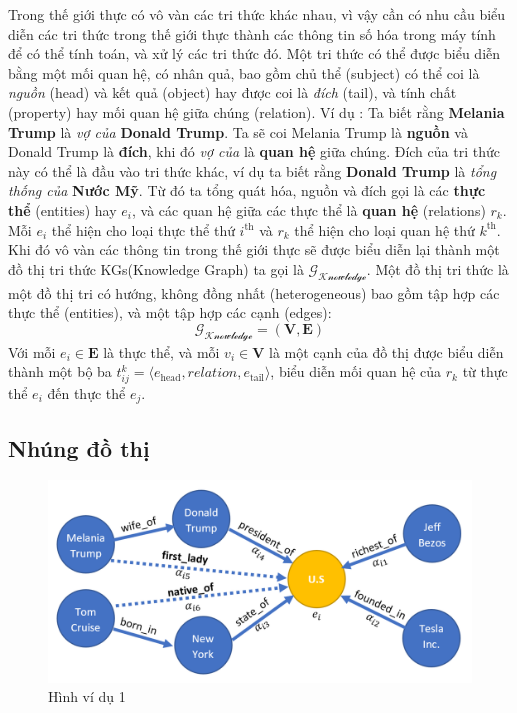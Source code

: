Trong thế giới thực có vô vàn các tri thức khác nhau, vì vậy cần có nhu cầu biểu diễn các tri thức trong thế giới thực thành các thông tin số hóa trong máy tính để có thể tính toán, và xử lý các tri thức đó. Một tri thức có thể được biểu diễn bằng một mối quan hệ, có nhân quả, bao gồm chủ thể (subject) có thể coi là \textit{nguồn} (head) và kết quả (object) hay được coi là \textit{đích} (tail), và tính chất (property) hay mối quan hệ giữa chúng (relation). Ví dụ : Ta biết rằng \textbf{Melania Trump} là \textit{vợ của} \textbf{Donald Trump}. Ta sẽ coi Melania Trump là \textbf{nguồn} và Donald Trump là \textbf{đích}, khi đó \textit{vợ của} là \textbf{quan hệ} giữa chúng. Đích của tri thức này có thể là đầu vào tri thức khác, ví dụ ta biết rằng \textbf{Donald Trump} là \textit{tổng thống của} \textbf{Nước Mỹ}. Từ đó ta tổng quát hóa, nguồn và đích  gọi là các \textbf{thực thể} (entities) hay $e_i$, và các quan hệ giữa các thực thể là \textbf{quan hệ} (relations) $r_k$. Mỗi $e_i$ thể hiện cho loại thực thể thứ $i^\text{th}$ và $r_k$ thể hiện cho loại quan hệ thứ $k^\text{th}$. Khi đó vô vàn các thông tin trong thế giới thực sẽ được biểu diễn lại thành một đồ thị tri thức KGs(Knowledge Graph) ta gọi là $\mathcal{G_{\text{Knowledge}}}$. Một đồ thị tri thức là một đồ thị tri có hướng, không đồng nhất (heterogeneous) bao gồm tập hợp các thực thể (entities), và một tập hợp các cạnh (edges):
$$
\mathcal{G_{\text{Knowledge}}} = (\mathbf{V},\mathbf{E})
$$
Với mỗi $e_i \in \mathbf{E}$ là thực thể, và mỗi $v_i \in \mathbf{V}$ là một cạnh của đồ thị được biểu diễn thành một bộ ba $t_{ij}^k = \langle e_\text{head}, relation, e_\text{tail} \rangle$, biểu diễn mối quan hệ của $r_k$ từ thực thể $e_i$ đến thực thể $e_j$.

\subsection{Nhúng đồ thị}

\begin{figure}[htp]
\centering
\includegraphics[width=\textwidth,height=\textheight,keepaspectratio]{images/graph_example.png}
\caption{Hình ví dụ 1}
\label{fig:vd1}
\end{figure}


